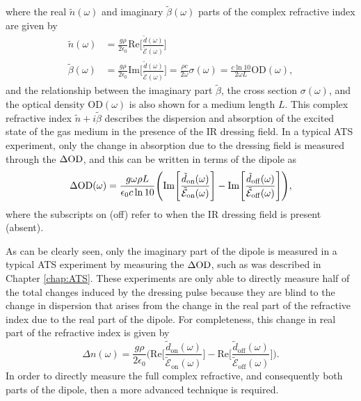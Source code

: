 where the real $\tilde{n}(\omega)$ and imaginary $\tilde{\beta}(\omega)$ parts of the complex refractive index are given by
\begin{equation}
	\begin{aligned}
		\tilde{n}(\omega) &= \frac{g \rho}{2 \epsilon_0} \mathrm{Re}\Bigg[ \frac{\tilde{d}(\omega)}{\tilde{\mathcal{E}}(\omega)} \Bigg]\\
		\tilde{\beta}(\omega) &= \frac{g \rho}{2\epsilon_0} \mathrm{Im}\Bigg[ \frac{\tilde{d}(\omega)}{\tilde{\mathcal{E}}(\omega)} \Bigg] = \frac{\rho c}{2\omega}\sigma(\omega) = \frac{c \ln 10}{2\omega L} \mathrm{OD}(\omega),
	\end{aligned}
\end{equation}
and the relationship between the imaginary part $\tilde{\beta}$, the cross section $\sigma(\omega)$, and the optical density $\mathrm{OD}(\omega)$ is also shown for a medium length $L$.  This complex refractive index $\tilde{n} + i\tilde{\beta}$ describes the dispersion and absorption of the excited state of the gas medium in the presence of the IR dressing field.  In a typical ATS experiment, only the change in absorption due to the dressing field is measured through the $\Delta\mathrm{OD}$, and this can be written in terms of the dipole as 
\begin{equation}
	\label{eqn:dod_im_dipole}
	\Delta\mathrm{OD}(\omega) = \frac{g \omega \rho L}{\epsilon_0 c \ln 10}\Bigg( \mathrm{Im}\Bigg[\frac{\tilde{d}_{\mathrm{on}}(\omega)}{\tilde{\mathcal{E}}_{\mathrm{on}}(\omega)}\Bigg] - \mathrm{Im}\Bigg[\frac{\tilde{d}_{\mathrm{off}}(\omega)}{\tilde{\mathcal{E}}_{\mathrm{off}}(\omega)}\Bigg] \Bigg),
\end{equation}
where the subscripts on (off) refer to when the IR dressing field is present (absent).

As can be clearly seen, only the imaginary part of the dipole is measured in a typical ATS experiment by measuring the $\Delta\mathrm{OD}$, such as was described in Chapter \ref{chap:ATS}.  These experiments are only able to directly measure half of the total changes induced by the dressing pulse because they are blind to the change in dispersion that arises from the change in the real part of the refractive index due to the real part of the dipole.  For completeness, this change in real part of the refractive index is given by 
\begin{equation}
	\label{eqn:dn_re_dipole}
	\Delta n(\omega) = \frac{g\rho}{2 \epsilon_0} \Bigg( \mathrm{Re}\Bigg[\frac{\tilde{d}_{\mathrm{on}}(\omega)}{\tilde{\mathcal{E}}_{\mathrm{on}}(\omega)}\Bigg] - \mathrm{Re}\Bigg[\frac{\tilde{d}_{\mathrm{off}}(\omega)}{\tilde{\mathcal{E}}_{\mathrm{off}}(\omega)}\Bigg] 
	\Bigg).
\end{equation}
In order to directly measure the full complex refractive, and consequently both parts of the dipole, then a more advanced technique is required. 


